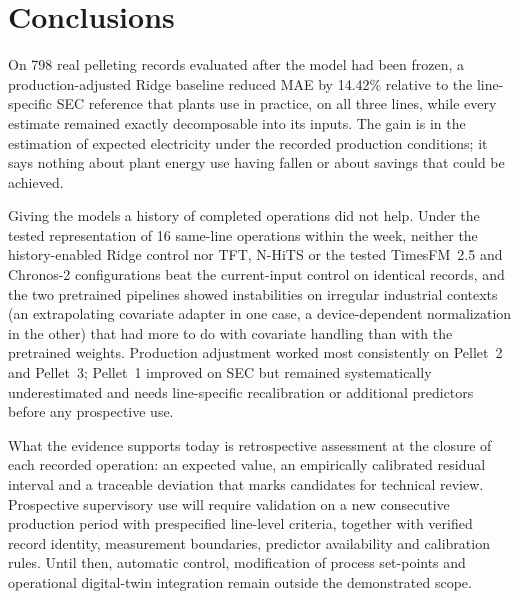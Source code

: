 \section{Conclusions}\label{sec:conclusions}
On 798 real pelleting records evaluated after the model had been frozen, a production-adjusted Ridge baseline reduced MAE by 14.42\% relative to the line-specific SEC reference that plants use in practice, on all three lines, while every estimate remained exactly decomposable into its inputs. The gain is in the estimation of expected electricity under the recorded production conditions; it says nothing about plant energy use having fallen or about savings that could be achieved.

Giving the models a history of completed operations did not help. Under the tested representation of 16 same-line operations within the week, neither the history-enabled Ridge control nor TFT, N-HiTS or the tested TimesFM~2.5 and Chronos-2 configurations beat the current-input control on identical records, and the two pretrained pipelines showed instabilities on irregular industrial contexts (an extrapolating covariate adapter in one case, a device-dependent normalization in the other) that had more to do with covariate handling than with the pretrained weights. Production adjustment worked most consistently on Pellet~2 and Pellet~3; Pellet~1 improved on SEC but remained systematically underestimated and needs line-specific recalibration or additional predictors before any prospective use.

What the evidence supports today is retrospective assessment at the closure of each recorded operation: an expected value, an empirically calibrated residual interval and a traceable deviation that marks candidates for technical review. Prospective supervisory use will require validation on a new consecutive production period with prespecified line-level criteria, together with verified record identity, measurement boundaries, predictor availability and calibration rules. Until then, automatic control, modification of process set-points and operational digital-twin integration remain outside the demonstrated scope.
